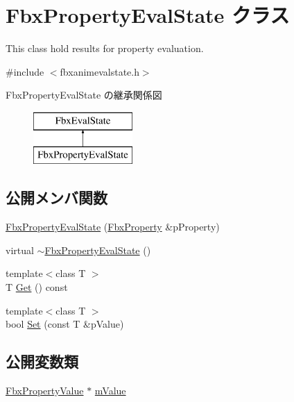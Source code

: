 \hypertarget{class_fbx_property_eval_state}{}\section{Fbx\+Property\+Eval\+State クラス}
\label{class_fbx_property_eval_state}


This class hold results for property evaluation.  




{\ttfamily \#include $<$fbxanimevalstate.\+h$>$}

Fbx\+Property\+Eval\+State の継承関係図\begin{figure}[H]
\begin{center}
\leavevmode
\includegraphics[height=2.000000cm]{class_fbx_property_eval_state}
\end{center}
\end{figure}
\subsection*{公開メンバ関数}
\begin{DoxyCompactItemize}
\item 
\hyperlink{class_fbx_property_eval_state_a19bcf828df536753374ab2477750df11}{Fbx\+Property\+Eval\+State} (\hyperlink{class_fbx_property}{Fbx\+Property} \&p\+Property)
\item 
virtual \hyperlink{class_fbx_property_eval_state_ab93c8dad1b9c6a759ebae7fa78dc0d57}{$\sim$\+Fbx\+Property\+Eval\+State} ()
\item 
{\footnotesize template$<$class T $>$ }\\T \hyperlink{class_fbx_property_eval_state_ad844efab953b35bcb5539f0c5667db0b}{Get} () const
\item 
{\footnotesize template$<$class T $>$ }\\bool \hyperlink{class_fbx_property_eval_state_ae6e8cdc04a89d508399aeb2d125eb4b7}{Set} (const T \&p\+Value)
\end{DoxyCompactItemize}
\subsection*{公開変数類}
\begin{DoxyCompactItemize}
\item 
\hyperlink{class_fbx_property_value}{Fbx\+Property\+Value} $\ast$ \hyperlink{class_fbx_property_eval_state_a8b773480c867eff130caea6646f81cae}{m\+Value}
\end{DoxyCompactItemize}


